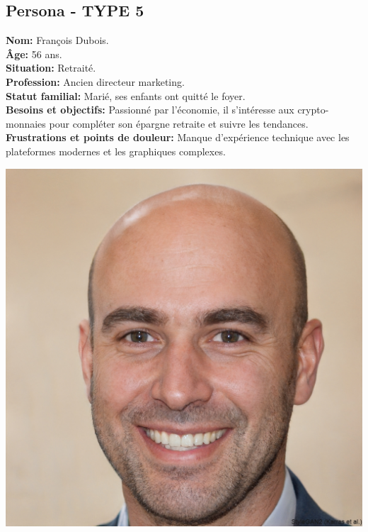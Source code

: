 \documentclass[a4paper,11pt]{article}
\begin{document}
\subsection{Persona - TYPE 5}
\begin{minipage}{0.6\textwidth} %
\textbf{Nom:} François Dubois.\\
\textbf{Âge:} 56 ans.\\
\textbf{Situation:} Retraité.\\
\textbf{Profession:} Ancien directeur marketing.\\
\textbf{Statut familial:} Marié, ses enfants ont quitté le foyer.\\
\textbf{Besoins et objectifs:} Passionné par l’économie, il s’intéresse aux crypto-monnaies pour compléter son épargne retraite et suivre les tendances.\\
\textbf{Frustrations et points de douleur:} Manque d’expérience technique avec les plateformes modernes et les graphiques complexes.\\
\end{minipage}%
\hspace{1cm}
\begin{minipage}{0.3\textwidth} %
    \begin{center}
        \includegraphics[width=\textwidth]{images/francois_50_ans.jpeg} %
    \end{center}
\end{minipage}
\end{document}
